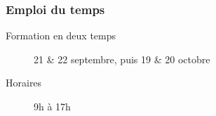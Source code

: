 
\begin{frame}
  \frametitle{Emploi du temps}
  \begin{description}
  \item[Formation en deux temps] 21 \& 22 septembre, puis 19 \& 20 octobre
  \item[Horaires] 9h à 17h
  \end{description}
\end{frame}

